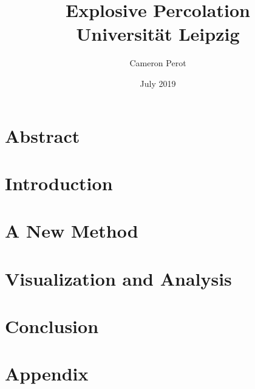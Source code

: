 \documentclass[12pt,twoside]{report}
\title{
    {Explosive Percolation}\\
    {\large Universität Leipzig}
    }
\author{Cameron Perot}
\date{July 2019}
\begin{document}
\maketitle
{}

\chapter*{Abstract}

\tableofcontents
\cleardoublepage
{}

\chapter{Introduction}


\chapter{A New Method}


\chapter{Visualization and Analysis}


\chapter{Conclusion}


\appendix
\chapter{Appendix}


\printbibliography
\end{document}
